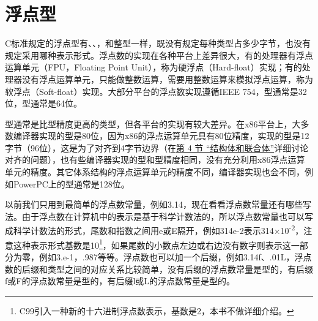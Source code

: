 


\section{浮点型}
%
C标准规定的浮点型有、、，和整型一样，既没有规定每种类型占多少字节，也没有规定采用哪种表示形式。浮点数的实现在各种平台上差异很大，有的处理器有浮点运算单元（FPU，Floating Point Unit），称为硬浮点（Hard-float）实现；有的处理器没有浮点运算单元，只能做整数运算，需要用整数运算来模拟浮点运算，称为软浮点（Soft-float）实现。大部分平台的浮点数实现遵循IEEE 754，型通常是32位，型通常是64位。



型通常是比型精度更高的类型，但各平台的实现有较大差异。在x86平台上，大多数编译器实现的型是80位，因为x86的浮点运算单元具有80位精度，实现的型是12字节（96位），这是为了对齐到4字节边界（在\hyperlink{db.ch19s04.id2779313}{第 4 节 “结构体和联合体”}详细讨论对齐的问题），也有些编译器实现的型和型精度相同，没有充分利用x86浮点运算单元的精度。其它体系结构的浮点运算单元的精度不同，编译器实现也会不同，例如PowerPC上的型通常是128位。



以前我们只用到最简单的浮点数常量，例如3.\BookSplit{}14，现在看看浮点数常量还有哪些写法。由于浮点数在计算机中的表示是基于科学计数法的，所以浮点数常量也可以写成科学计数法的形式，尾数和指数之间用e或E隔开，例如314e-2表示314×\BookSplit{}10\textsuperscript{-2}，注意这种表示形式基数是10\footnote[27]{C99引入一种新的十六进制浮点数表示，基数是2，本书不做详细介绍。}，如果尾数的小数点左边或右边没有数字则表示这一部分为零，例如3.\BookSplit{}e-1，.987等等。浮点数也可以加一个后缀，例如3.\BookSplit{}14f、.01L，浮点数的后缀和类型之间的对应关系比较简单，没有后缀的浮点数常量是型的，有后缀f或F的浮点数常量是型的，有后缀l或L的浮点数常量是型的。

